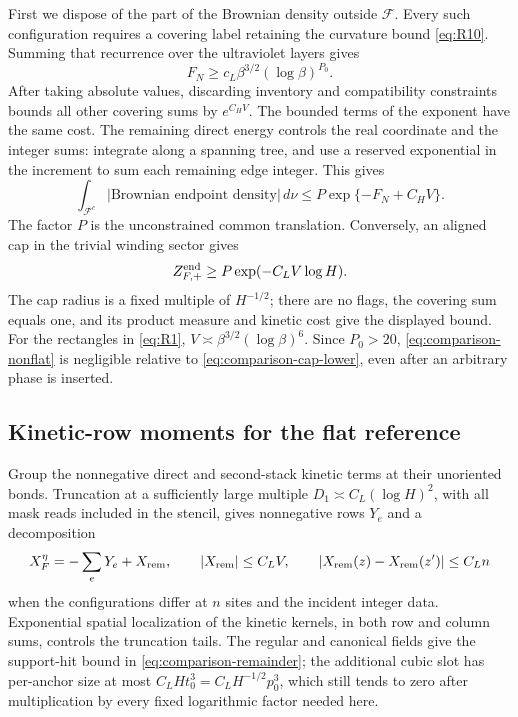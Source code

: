 First we dispose of the part of the Brownian density outside \(\mathcal F\).  Every such
configuration requires a covering label retaining the curvature bound
\eqref{eq:R10}.  Summing that recurrence over the ultraviolet layers gives
\[
 F_N\ge c_L\beta^{3/2}(\log\beta)^{P_0}.
\]
After taking absolute values, discarding inventory and compatibility
constraints bounds all other covering sums by \(e^{C_HV}\).  The bounded
terms of the exponent have the same cost.  The remaining direct energy
controls the real coordinate and the integer sums: integrate along a
spanning tree, and use a reserved exponential in the increment to sum
each remaining edge integer.  This gives
\begin{equation}
 \int_{\mathcal F^c}|\text{Brownian endpoint density}|\,d\nu
 \le P\exp\{-F_N+C_HV\}.
 \label{eq:comparison-nonflat}
\end{equation}
The factor \(P\) is the unconstrained common translation.  Conversely,
an aligned cap in the trivial winding sector gives
\begin{equation}
 Z_{F,+}^{\rm end}\ge P\exp(-C_LV\log H).
 \label{eq:comparison-cap-lower}
\end{equation}
The cap radius is a fixed multiple of \(H^{-1/2}\); there are no flags,
the covering sum equals one, and its product measure and kinetic cost
give the displayed bound.  For the rectangles in \eqref{eq:R1},
\(V\asymp\beta^{3/2}(\log\beta)^6\).  Since \(P_0>20\),
\eqref{eq:comparison-nonflat} is negligible relative to
\eqref{eq:comparison-cap-lower}, even after an arbitrary phase is inserted.

\subsection{Kinetic-row moments for the flat reference}
\label{subsec:comparison-row-moments}

Group the nonnegative direct and second-stack kinetic terms at their
unoriented bonds.  Truncation at a sufficiently large multiple
\(D_1\asymp C_L(\log H)^2\), with all mask reads included in the stencil,
gives nonnegative rows \(Y_e\) and a decomposition
\begin{equation}
 X_F^\eta=-\sum_eY_e+X_{\rm rem},\qquad
 |X_{\rm rem}|\le C_LV,
 \qquad
 |X_{\rm rem}(z)-X_{\rm rem}(z')|\le C_Ln
 \label{eq:comparison-remainder}
\end{equation}
when the configurations differ at \(n\) sites and the incident integer
data.  Exponential spatial localization of the kinetic kernels, in both
row and column sums, controls the truncation tails.  The
regular and canonical fields give the support-hit bound in
\eqref{eq:comparison-remainder}; the additional cubic slot has per-anchor
size at most \(C_LHt_0^3=C_LH^{-1/2}p_0^3\), which still tends to zero
after multiplication by every fixed logarithmic factor needed here.

